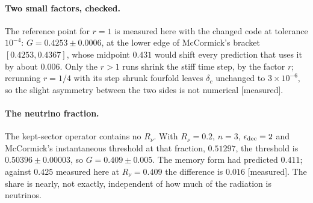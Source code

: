 \documentclass[11pt]{article}
\newcommand{\grade}[1]{\textsf{\small[#1]}}
\begin{document}
\paragraph{Two small factors, checked.} The reference point for $r=1$ is measured here with the changed code at tolerance $10^{-4}$: $G=0.4253\pm0.0006$, at the lower edge of McCormick's bracket $[0.4253,0.4367]$, whose midpoint $0.431$ would shift every prediction that uses it by about $0.006$. Only the $r>1$ runs shrink the stiff time step, by the factor $r$; rerunning $r=1/4$ with its step shrunk fourfold leaves $\delta_c$ unchanged to $3\times10^{-6}$, so the slight asymmetry between the two sides is not numerical \grade{measured}.

\paragraph{The neutrino fraction.} The kept-sector operator contains no $R_\nu$. With $R_\nu=0.2$, $n=3$, $\epsilon_{\rm dec}=2$ and McCormick's instantaneous threshold at that fraction, $0.51297$, the threshold is $0.50396\pm0.00003$, so $G=0.409\pm0.005$. The memory form had predicted $0.411$; against $0.425$ measured here at $R_\nu=0.409$ the difference is $0.016$ \grade{measured}. The share is nearly, not exactly, independent of how much of the radiation is neutrinos.
\end{document}
